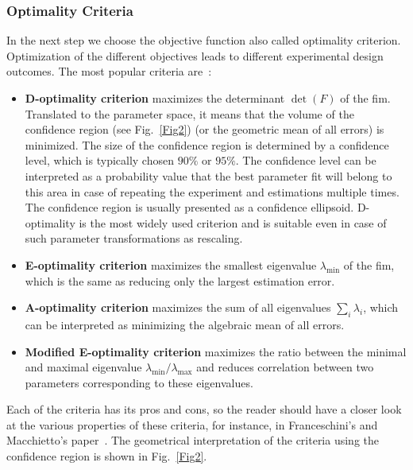 \documentclass[graybox]{svmult}
\begin{document}
\subsubsection{Optimality Criteria}
In the next step we choose the objective function also called optimality criterion.
Optimization of the different objectives leads to different experimental design outcomes.
The most popular criteria are~\cite{balsa-cantoe.bangaj.r.COMPUTINGOPTIMALDYNAMIC2008, dette_designing_1997, walter_qualitative_1990}:
\begin{itemize}
\item \textbf{D-optimality criterion} maximizes the determinant $\det (F)$ of the \ac{fim}.
 Translated to the parameter space, it means that the volume of the confidence region (see Fig.~\ref{Fig2}) (or the geometric mean of all errors) is minimized.
 The size of the confidence region is determined by a confidence level, which is typically chosen $90 \%$ or $95 \%$.
 The confidence level can be interpreted as a probability value that the best
 parameter fit will belong to this area in case of repeating the experiment and estimations multiple times.
 The confidence region is usually presented as a confidence ellipsoid.
 D-optimality is the most widely used criterion and is suitable even in case of such parameter transformations as rescaling.
\item \textbf{E-optimality criterion} maximizes the smallest eigenvalue $\lambda_{\min}$ of the \ac{fim}, which is the same as reducing only the largest estimation error.
\item \textbf{A-optimality criterion} maximizes the sum of all eigenvalues $\sum_i \lambda_i$, which can be interpreted as minimizing the algebraic mean of all errors.
\item \textbf{Modified E-optimality criterion} maximizes the ratio between the minimal and maximal eigenvalue $\lambda_{\min} / \lambda_{\max}$ and reduces correlation between two parameters corresponding to these eigenvalues.

\end{itemize}
Each of the criteria has its pros and cons, so the reader should have a closer look at the various properties of these criteria, for instance, in Franceschini's and Macchietto's paper~\cite{franceschiniModelbasedDesignExperiments2008}.
The geometrical interpretation of the criteria using the confidence region is shown in Fig.~\ref{Fig2}.
%
%
\end{document}
